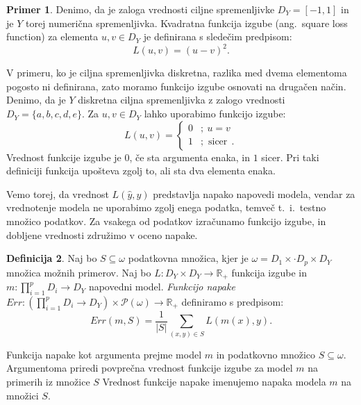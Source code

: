 \documentclass[12pt,a4paper,twoside]{article}
\theoremstyle{definition} %
\newtheorem{definicija}{Definicija}[section]
\newtheorem{primer}[definicija]{Primer}
\theoremstyle{plain} %
\numberwithin{equation}{section}  %
\begin{document}
\begin{primer}
Denimo, da je zaloga vrednosti ciljne spremenljivke $D_Y = [-1,1]$ in je $Y$ torej numerična spremenljivka. 
Kvadratna funkcija izgube (ang.~square loss function) za elementa $u, v \in D_Y$ je definirana s sledečim predpisom:
$$
L(u,v) = (u - v)^2.
$$

V primeru, ko je ciljna spremenljivka diskretna, razlika med dvema elementoma pogosto ni definirana, zato moramo funkcijo izgube osnovati na drugačen način. 
Denimo, da je $Y$ diskretna ciljna spremenljivka z zalogo vrednosti $D_Y = \{a,b,c,d,e\}$. 
Za $u, v \in D_Y$ lahko uporabimo funkcijo izgube:
\[
	L(u,v) =
	\begin{cases}
	0 &;\ u= v \\
	1 &; \text{ sicer}\ \ .
	\end{cases}
\]
Vrednost funkcije izgube je $0$, če sta argumenta enaka, in $1$ sicer. 
Pri taki definiciji funkcija upošteva zgolj to, ali sta dva elementa enaka.
\end{primer}

Vemo torej, da vrednost $L(\hat{y}, y)$ predstavlja napako napovedi modela, vendar za vrednotenje modela ne uporabimo zgolj enega podatka, temveč t.~i.\ testno množico podatkov. 
Za vsakega od podatkov izračunamo funkcijo izgube, in dobljene vrednosti združimo v oceno napake.

\begin{definicija}
\label{def-funkcija-napake}
	Naj bo $S \subseteq \omega$ podatkovna množica, kjer je $\omega = D_1 \times \cdot D_p \times D_Y$ množica možnih primerov.
	Naj bo $L: D_Y \times D_Y \rightarrow \mathbb{R}_+$ funkcija izgube in $m: \prod_{i=1}^p D_i \rightarrow D_Y$ napovedni model. 
	\emph{Funkcijo napake} $Err: (\prod_{i=1}^p D_i \rightarrow D_Y) \times \mathcal P (\omega) \rightarrow \mathbb{R}_+$ definiramo s predpisom:
	\[
	Err(m,S) = \frac{1}{|S|} \sum_{(x,y) \in S} L(m(x),y).
	\]
\end{definicija}

Funkcija napake kot argumenta prejme model $m$ in podatkovno množico $S \subseteq \omega$.
Argumentoma priredi povprečna vrednost funkcije izgube za model $m$ na primerih iz množice $S$
Vrednost funkcije napake imenujemo napaka modela $m$ na množici $S$.

\end{document}
